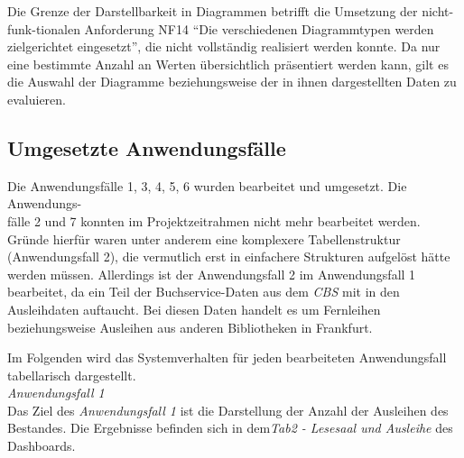 Die Grenze der Darstellbarkeit in Diagrammen betrifft die Umsetzung der nicht-funk-tionalen Anforderung NF14 \enquote{Die verschiedenen Diagrammtypen werden zielgerichtet eingesetzt},
die nicht vollständig realisiert werden konnte. Da nur eine bestimmte Anzahl an Werten übersichtlich präsentiert werden kann, gilt es die Auswahl der Diagramme
beziehungsweise der in ihnen dargestellten Daten zu evaluieren. 



\subsection{Umgesetzte Anwendungsfälle}
Die Anwendungsfälle 1, 3, 4, 5, 6 wurden bearbeitet und umgesetzt.
Die Anwendungs-\\fälle 2 und 7 konnten im Projektzeitrahmen nicht mehr bearbeitet werden. Gründe hierfür waren unter anderem eine komplexere Tabellenstruktur (Anwendungsfall 2),
die vermutlich erst in einfachere Strukturen aufgelöst hätte werden müssen. Allerdings ist der Anwendungsfall 2
im Anwendungsfall 1 bearbeitet, da ein Teil der Buchservice-Daten aus dem \textit{\acrshort{CBS}} mit in den Ausleihdaten
auftaucht. Bei diesen Daten handelt es um Fernleihen beziehungsweise Ausleihen aus anderen Bibliotheken in Frankfurt. 

Im Folgenden wird das Systemverhalten für jeden bearbeiteten Anwendungsfall tabellarisch dargestellt.\\

\clearpage
\noindent
\textit{Anwendungsfall 1}\\
Das Ziel des \textit{Anwendungsfall 1} ist die Darstellung der Anzahl der Ausleihen des Bestandes.
Die Ergebnisse befinden sich in dem\textit{Tab2 - Lesesaal und Ausleihe} des Dashboards.

